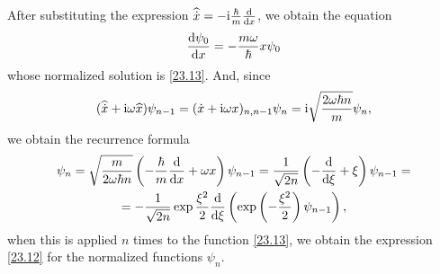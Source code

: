 After substituting the expression $ \widehat{\dot{x}}=-\mathrm{i}\frac{\hbar}{m}\frac{\mathrm{d}}{\mathrm{d} x} $, we obtain the equation
\[ \frac{\mathrm{d} \psi_0}{\mathrm{d} x}=-\frac{m\omega}{\hbar}x\psi_0 \]
whose normalized solution is \eqref{23.13}. And, since
\[ (\widehat{\dot{x}}+\mathrm{i}\omega\widehat{x})\psi_{n-1}=(\dot{x}+\mathrm{i}\omega x)_{n,n-1}\psi_n=\mathrm{i}\sqrt{\frac{2\omega\hbar n}{m}}\psi_n, \]
we obtain the recurrence formula
\begin{multline*}
\psi_n=\sqrt{\frac{m}{2\omega\hbar n}}\left(-\frac{\hbar}{m}\frac{\mathrm{d}}{\mathrm{d} x}+\omega x \right)\psi_{n-1}=\frac{1}{\sqrt{2n}}\left(-\frac{\mathrm{d}}{\mathrm{d}\xi}+\xi \right)\psi_{n-1}=\\
=-\frac{1}{\sqrt{2n}}\exp\frac{\xi^2}{2}\frac{\mathrm{d}}{\mathrm{d}\xi}\left(\exp\left(-\frac{\xi^2}{2} \right)\psi_{n-1} \right),
\end{multline*}
when this is applied $ n $ times to the function \eqref{23.13}, we obtain the expression \eqref{23.12} for the normalized functions $\psi_n$.





